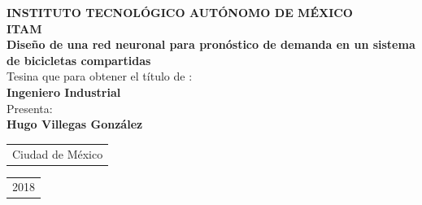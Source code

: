 \documentclass[12pt,spanish]{article}
\begin{document}
	\thispagestyle{empty}
	\begin{center}
		\textbf{\large {INSTITUTO  TECNOLÓGICO AUTÓNOMO DE MÉXICO}}\\[0.3cm]
		\textbf{\Huge{ITAM}}\\[1.5cm]
		{\large\textbf{Diseño de una red neuronal para pronóstico de demanda en un sistema de bicicletas compartidas}}\\[1.6cm]
		{\large Tesina que para obtener el título de :}\\[0.1cm]
		{\large  \textbf{Ingeniero Industrial}}\\[2.1cm]
		{\large Presenta: }\\[0.1cm]
		{\large  \textbf{Hugo Villegas González}}\\[2.1cm]
		\vfill\noindent
		\begin{tabular}[t]{@{}l} 
			\large{Ciudad de México}
		\end{tabular}
		\hfill%
		\begin{tabular}[t]{l@{}}
			\large{2018}
		\end{tabular}
	\end{center}
	\newpage
	\tableofcontents                                %
	\newpage 
	\listoffigures                                  %
	\newpage 
	\listoftables                                   %
	\newpage
\end{document}
